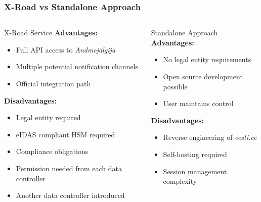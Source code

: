 \documentclass[aspectratio=169,11pt]{beamer}
\begin{document}
\begin{frame}
\frametitle{X-Road vs Standalone Approach}
\begin{columns}[t]
\begin{column}{0.47\textwidth}
\begin{block}{X-Road Service}
\textbf{Advantages:}
\begin{itemize}
    \item Full API access to \textit{Andmejälgija}
    \item Multiple potential notification channels
    \item Official integration path
\end{itemize}

\textbf{Disadvantages:}
\begin{itemize}
    \item Legal entity required
    \item eIDAS compliant HSM required
    \item Compliance obligations
    \item Permission needed from each data controller
    \item Another data controller introduced
\end{itemize}
\end{block}
\end{column}
\begin{column}{0.47\textwidth}
\begin{block}{Standalone Approach}
\textbf{Advantages:}
\begin{itemize}
    \item No legal entity requirements
    \item Open source development possible
    \item User maintains control
\end{itemize}

\textbf{Disadvantages:}
\begin{itemize}
    \item Reverse engineering of \textit{eesti.ee}
    \item Self-hosting required
    \item Session management complexity
\end{itemize}
\end{block}
\end{column}
\end{columns}
\end{frame}
\end{document}
